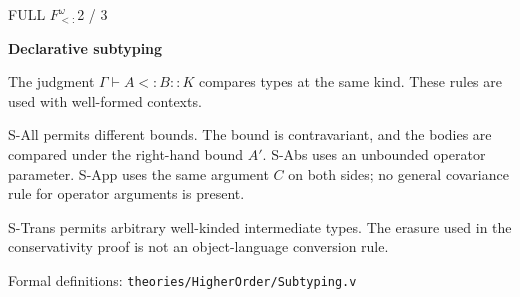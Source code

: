 \documentclass[11pt,border=12pt,multi=sheet]{standalone}
\newenvironment{sheet}{%
  \begin{minipage}{160mm}\color{ink}%
  \setlength{\parindent}{0pt}\setlength{\parskip}{5pt}%
  \setlength{\abovedisplayskip}{7pt}\setlength{\belowdisplayskip}{7pt}%
}{\end{minipage}}
\newcommand{\sheettitle}[2]{%
  {\sffamily\color{accent}\small FULL $F_{<:}^{\omega}$\hfill #1 / 3}\par
  {\sffamily\bfseries\fontsize{18}{22}\selectfont #2}\par
  \vspace{2pt}{\color{muted}\hrule height .35pt}\vspace{8pt}}
\newcommand{\blocktitle}[1]{\par\vspace{5pt}{\sffamily\bfseries #1}\par}
\newcommand{\note}[1]{{\small\color{muted}#1\par}}
\newcommand{\source}[1]{\vspace{6pt}{\color{muted}\hrule height .25pt}\vspace{4pt}%
  {\scriptsize\sffamily Formal definitions: \texttt{#1}\par}}
\newcommand{\Top}{\mathrm{Top}}
\newcommand{\All}[3]{\forall X<:#1::#2.\,#3}
\newcommand{\ki}[3]{#1\vdash #2::#3}
\newcommand{\su}[4]{#1\vdash #2<:#3::#4}
\newcommand{\bound}[2]{\Gamma,X<:#1::#2}
\begin{document}
\begin{sheet}
\sheettitle{2}{Declarative subtyping}
\note{The judgment $\su{\Gamma}{A}{B}{K}$ compares types at the same kind.
These rules are used with well-formed contexts.}


\blocktitle{Full quantification and pointwise operators}
\note{S-All permits different bounds. The bound is contravariant, and
the bodies are compared under the right-hand bound $A'$. S-Abs uses an
unbounded operator parameter. S-App uses the same argument $C$ on both
sides; no general covariance rule for operator arguments is present.}
\note{S-Trans permits arbitrary well-kinded intermediate types. The erasure
used in the conservativity proof is not an object-language conversion rule.}
\source{theories/HigherOrder/Subtyping.v}
\end{sheet}
\end{document}
